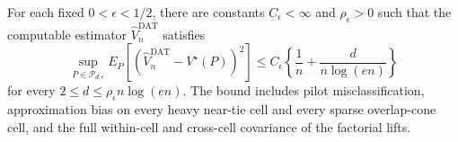 For each fixed \(0<\epsilon<1/2\), there are constants \(C_\epsilon<\infty\) and \(\rho_\epsilon>0\) such that the computable estimator \(\widehat V_n^{\mathrm{DAT}}\) satisfies \[\sup_{P\in\mathcal P_{d,\epsilon}}E_P[(\widehat V_n^{\mathrm{DAT}}-V^\star(P))^2]\le C_\epsilon\left\{\frac1n+\frac{d}{n\log(en)}\right\}\] for every \(2\le d\le\rho_\epsilon n\log(en)\). The bound includes pilot misclassification, approximation bias on every heavy near-tie cell and every sparse overlap-cone cell, and the full within-cell and cross-cell covariance of the factorial lifts.
